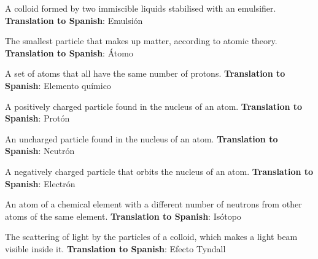 \begin{vocabulary}[Emulsion]
    A colloid formed by two immiscible liquids stabilised with an emulsifier. \newline
    \textbf{Translation to Spanish}: Emulsión
\end{vocabulary}

\begin{vocabulary}[Atom]
    The smallest particle that makes up matter, according to atomic theory. \newline
    \textbf{Translation to Spanish}: Átomo
\end{vocabulary}

\begin{vocabulary}
    A set of atoms that all have the same number of protons. \newline
    \textbf{Translation to Spanish}: Elemento químico
\end{vocabulary}

\begin{vocabulary}[Proton]
    A positively charged particle found in the nucleus of an atom. \newline
    \textbf{Translation to Spanish}: Protón
\end{vocabulary}

\begin{vocabulary}[Neutron]
    An uncharged particle found in the nucleus of an atom. \newline
    \textbf{Translation to Spanish}: Neutrón
\end{vocabulary}

\begin{vocabulary}[Electron]
    A negatively charged particle that orbits the nucleus of an atom. \newline
    \textbf{Translation to Spanish}: Electrón
\end{vocabulary}

\begin{vocabulary}[Isotope]
    An atom of a chemical element with a different number of neutrons from other atoms of the same element. \newline
    \textbf{Translation to Spanish}: Isótopo
\end{vocabulary}

\begin{vocabulary}
    The scattering of light by the particles of a colloid, which makes a light beam visible inside it. \newline
    \textbf{Translation to Spanish}: Efecto Tyndall
\end{vocabulary}

